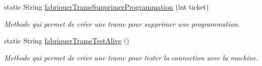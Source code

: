\begin{DoxyCompactItemize}
static String \hyperlink{classcom_1_1example_1_1ekawa_1_1_protocole_afa3ca73b737062d6048c1a6cc9c8c79d}{fabriquer\+Trame\+Supprimer\+Programmation} (int ticket)
\begin{DoxyCompactList}\small\item\em Methode qui permet de créer une trame pour supprimer une programmation. \end{DoxyCompactList}\item 
static String \hyperlink{classcom_1_1example_1_1ekawa_1_1_protocole_a6a93842b8987e56582d83c778305840a}{fabriquer\+Trame\+Test\+Alive} ()
\begin{DoxyCompactList}\small\item\em Methode qui permet de créer une trame pour tester la connection avec la machine. \end{DoxyCompactList}\end{DoxyCompactItemize}
